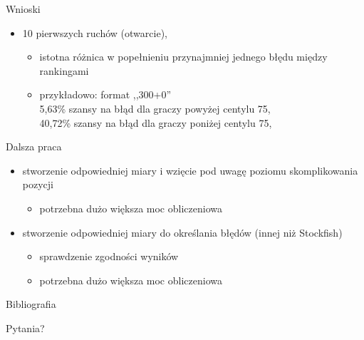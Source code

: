 \documentclass{beamer}
\begin{document}
\begin{frame}{Wnioski}
	\begin{itemize}
		\item 10 pierwszych ruchów (otwarcie), 
		\begin{itemize}
			\item istotna różnica w popełnieniu przynajmniej jednego  błędu między rankingami
			\item przykładowo: format ,,300+0''\\ 
			\phantom{4}5,63\% szansy na błąd dla graczy powyżej centylu 75, \\
			40,72\% szansy na błąd dla graczy poniżej centylu 75, \\
		\end{itemize}	
	\end{itemize}
\end{frame}


\begin{frame}{Dalsza praca}
	\begin{itemize}
		\item stworzenie odpowiedniej miary i wzięcie pod uwagę poziomu skomplikowania pozycji
		\begin{itemize}
			\item potrzebna dużo większa moc obliczeniowa	
		\end{itemize}
	
		\item stworzenie odpowiedniej miary do określania błędów (innej niż Stockfish)
		\begin{itemize}
			\item sprawdzenie zgodności wyników
			\item potrzebna dużo większa moc obliczeniowa	
		\end{itemize}
	\end{itemize}
	
\end{frame}

\begin{frame}{Bibliografia}
	 
\end{frame}

\begin{frame}{Pytania?}
\end{frame}
\end{document}
